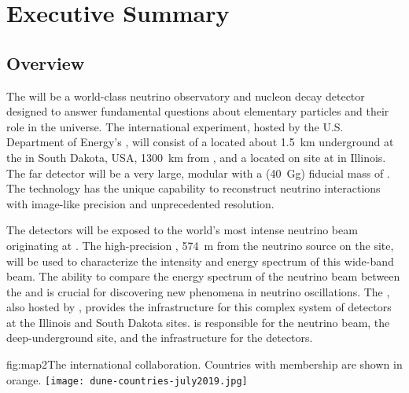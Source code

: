 \chapter{Executive Summary}
\label{ch:exec-overall}

\section{Overview}
\label{sec:exec-overall-1}

The  will be a world-class neutrino observatory and nucleon decay detector designed to answer fundamental questions about elementary particles and their role in the universe. The international  experiment, hosted by the U.S. Department of Energy's , will consist of a  located about \SI{1.5}{km} underground at the  in South Dakota, USA, \SI{1300}{\km} from , and a  located on site at  in Illinois. The far detector will be a very large, modular  with a \fdfiducialmass (\SI{40}{\giga\gram}) fiducial mass of . The  technology 
has the unique capability to reconstruct neutrino interactions with image-like precision and unprecedented resolution. 

The  detectors will be exposed to the world's most intense neutrino beam originating at . The high-precision , \SI{574}{m} from the neutrino source on the  site, will be used to characterize the intensity and energy spectrum of this wide-band beam. The ability to compare the energy spectrum of the neutrino beam between the  and 
is crucial for discovering new phenomena in neutrino oscillations. The , also hosted by , provides the infrastructure for this complex system of detectors at the Illinois and South Dakota sites.  is responsible for the neutrino beam, the deep-underground site, and the infrastructure for the  detectors. 

\begin{dunefigure}{fig:map2}{The international 
collaboration. Countries with  membership are shown in orange.}
\texttt{[image: dune-countries-july2019.jpg]}  
\end{dunefigure} %

